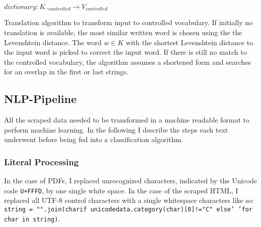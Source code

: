 \begin{algorithm}[h]
  \SetAlgoLined
    $dictionary: K_{\neg controlled} \to V_{controlled}$\;
\caption{Translation algorithm to transform input to controlled vocabulary. If initially no translation is available, the most similar written word is chosen using the the Levenshtein distance. The word $w \in K$ with the shortest Levenshtein distance to the input word is picked to correct the input word. If there is still no match to the controlled vocabulary, the algorithm assumes a shortened form and searches for an overlap in the first or last strings.}
\label{lst:translate}
\end{algorithm}

\subsection{NLP-Pipeline}
All the scraped data needed to be transformed in a machine readable format to perform machine learning. In the following I describe the steps each text underwent before being fed into a classification algorithm.

\subsubsection{Literal Processing}
In the case of PDFs, I replaced unrecognized characters, indicated by the Unicode code \texttt{U+FFFD}, by one single white space. In the case of the scraped HTML, I replaced all UTF-8 control characters with a single whitespace characters like so: \texttt{string = \allowbreak "".join\allowbreak(char\allowbreak if unicodedata\allowbreak.category(char)[0]\allowbreak !=\allowbreak "C" else\allowbreak ' '\allowbreak for char in string)}.

